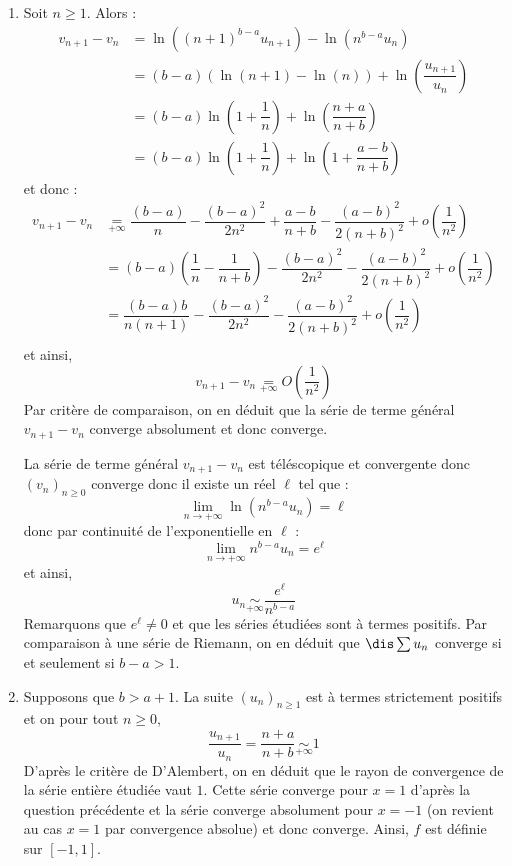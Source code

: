 \documentclass[a4paper,10pt]{report}
\begin{document}
\begin{corr} 
\begin{enumerate}
\item Soit $n \geq 1$. Alors :
\begin{align*}
v_{n+1}-v_n & = \ln((n+1)^{b-a} u_{n+1}) - \ln(n^{b-a} u_n) \\
& = (b-a) (\ln(n+1)- \ln(n)) + \ln \left( \dfrac{u_{n+1}}{u_n} \right) \\
& = (b-a) \ln \left( 1+\dfrac{1}{n} \right) + \ln\left( \dfrac{n+a}{n+b} \right) \\
& = (b-a) \ln \left( 1+\dfrac{1}{n} \right) + \ln\left( 1+\dfrac{a-b}{n+b} \right) 
\end{align*}
et donc :
\begin{align*}
v_{n+1}-v_n  & \underset{+ \infty}{=} \dfrac{(b-a)}{n} - \dfrac{(b-a)^2}{2n^2} +\dfrac{a-b}{n+b} - \dfrac{(a-b)^2}{2(n+b)^2} + o \left( \dfrac{1}{n^2} \right) \\
& = (b-a) \left( \dfrac{1}{n} - \dfrac{1}{n+b} \right) - \dfrac{(b-a)^2}{2n^2} - \dfrac{(a-b)^2}{2(n+b)^2} + o \left( \dfrac{1}{n^2} \right) \\
& = \dfrac{(b-a)b}{n(n+1)} - \dfrac{(b-a)^2}{2n^2} - \dfrac{(a-b)^2}{2(n+b)^2} + o \left( \dfrac{1}{n^2} \right) \\
\end{align*}
et ainsi,
$$ v_{n+1}-v_n \underset{+ \infty}{=}  O \left( \dfrac{1}{n^2} \right)$$
Par critère de comparaison, on  en déduit que la série de terme général $v_{n+1}-v_n$ converge absolument et donc converge.

\medskip

\noindent La série de terme général $v_{n+1}-v_n$ est téléscopique et convergente donc $(v_n)_{n \geq 0}$ converge donc il existe un réel $\ell$ tel que :
$$ \lim_{n \rightarrow + \infty} \ln(n^{b-a} u_n) = \ell$$
donc par continuité de l'exponentielle en $\ell$ :
$$ \lim_{n \rightarrow + \infty} n^{b-a} u_n = e^{\ell}$$
et ainsi,
$$ u_n \underset{+ \infty}{\sim} \dfrac{e^{\ell}}{n^{b-a}}$$
Remarquons que $e^{\ell} \neq 0$ et que les séries étudiées sont à termes positifs. Par comparaison à une série de Riemann, on en déduit que $\dis \sum u_n$ converge si et seulement si $b-a>1$.
\item Supposons que $b>a+1$. La suite $(u_n)_{n \geq 1}$ est à termes strictement positifs et on pour tout $n \geq 0$,
$$ \dfrac{u_{n+1}}{u_n} = \dfrac{n+a}{n+b} \underset{+ \infty}{\sim} 1$$
D'après le critère de D'Alembert, on en déduit que le rayon de convergence de la série entière étudiée vaut $1$. Cette série converge pour $x=1$ d'après la question précédente et la série converge absolument pour $x=-1$ (on revient au cas $x=1$ par convergence absolue) et donc converge. Ainsi, $f$ est définie sur $[-1,1]$.


\end{enumerate}
\end{corr}
\end{document}
